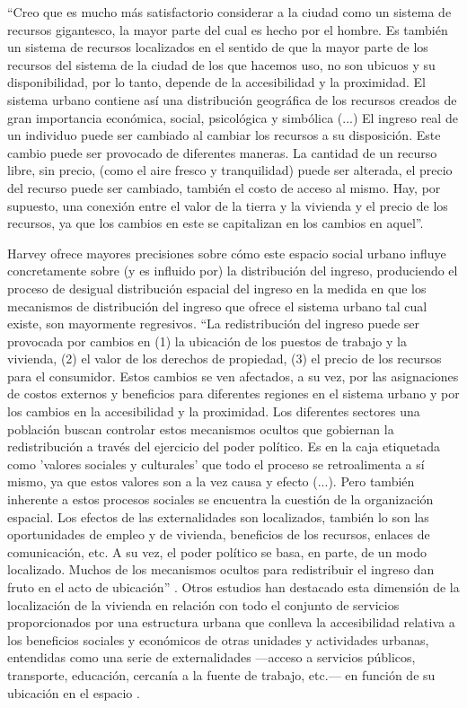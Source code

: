 	“Creo que es mucho más satisfactorio considerar a la ciudad como un sistema de recursos gigantesco, la mayor parte del cual es hecho por el hombre. Es también un sistema de recursos localizados en el sentido de que la mayor parte de los recursos del sistema de la ciudad de los que hacemos uso, no son ubicuos y su disponibilidad, por lo tanto, depende de la accesibilidad y la proximidad. El sistema urbano contiene así una distribución geográfica de los recursos creados de gran importancia económica, social, psicológica y simbólica (...) El ingreso real de un individuo puede ser cambiado al cambiar los recursos a su disposición. Este cambio puede ser provocado de diferentes maneras. La cantidad de un recurso libre, sin precio, (como el aire fresco y tranquilidad) puede ser alterada, el precio del recurso puede ser cambiado, también el costo de acceso al mismo. Hay, por supuesto, una conexión entre el valor de la tierra y la vivienda y el precio de los recursos, ya que los cambios en este se capitalizan en los cambios en aquel”\cite[p.~68]{harvey}.
	
	Harvey ofrece mayores precisiones sobre cómo este espacio social urbano influye concretamente sobre (y es influido por) la distribución del ingreso, produciendo el proceso de desigual distribución espacial del ingreso en la medida en que los mecanismos de distribución del ingreso que ofrece el sistema urbano tal cual existe, son mayormente regresivos. “La redistribución del ingreso puede ser provocada por cambios en (1) la ubicación de los puestos de trabajo y la vivienda, (2) el valor de los derechos de propiedad, (3) el precio de los recursos para el consumidor. Estos cambios se ven afectados, a su vez, por las asignaciones de costos externos y beneficios para diferentes regiones en el sistema urbano y por los cambios en la accesibilidad y la proximidad. Los diferentes sectores una población buscan controlar estos mecanismos ocultos que gobiernan la redistribución a través del ejercicio del poder político. Es en la caja etiquetada como 'valores sociales y culturales' que todo el proceso se retroalimenta a sí mismo, ya que estos valores son a la vez causa y efecto (...). Pero también inherente a estos procesos sociales se encuentra la cuestión de la organización espacial. Los efectos de las externalidades son localizados, también lo son las oportunidades de empleo y de vivienda, beneficios de los recursos, enlaces de comunicación, etc. A su vez, el poder político se basa, en parte, de un modo localizado. Muchos de los mecanismos ocultos para redistribuir el ingreso dan fruto en el acto de ubicación” \cite[p.~86]{harvey}. Otros estudios han destacado esta dimensión de la localización de la vivienda en relación con todo el conjunto de servicios proporcionados por una estructura urbana que conlleva la accesibilidad relativa a los beneficios sociales y económicos de otras unidades y actividades urbanas, entendidas como una serie de externalidades —acceso a servicios públicos, transporte, educación, cercanía a la fuente de trabajo, etc.— en función de su ubicación en el espacio 	\cite{yujnovsky,oszlak}.
	
